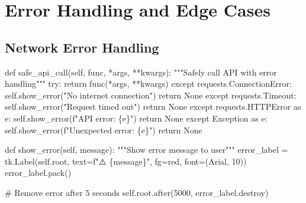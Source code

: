 \documentclass[
  letterpaper,
  DIV=11,
  numbers=noendperiod,
  oneside]{scrreprt}
\newenvironment{Shaded}{}{}
\newcommand{\CommentTok}[1]{\textcolor[rgb]{0.42,0.45,0.49}{#1}}
\newcommand{\ControlFlowTok}[1]{\textcolor[rgb]{0.84,0.23,0.29}{#1}}
\newcommand{\DecValTok}[1]{\textcolor[rgb]{0.00,0.36,0.77}{#1}}
\newcommand{\ImportTok}[1]{\textcolor[rgb]{0.01,0.18,0.38}{#1}}
\newcommand{\KeywordTok}[1]{\textcolor[rgb]{0.84,0.23,0.29}{#1}}
\newcommand{\NormalTok}[1]{\textcolor[rgb]{0.14,0.16,0.18}{#1}}
\newcommand{\OperatorTok}[1]{\textcolor[rgb]{0.14,0.16,0.18}{#1}}
\newcommand{\PreprocessorTok}[1]{\textcolor[rgb]{0.84,0.23,0.29}{#1}}
\newcommand{\SpecialCharTok}[1]{\textcolor[rgb]{0.00,0.36,0.77}{#1}}
\newcommand{\SpecialStringTok}[1]{\textcolor[rgb]{0.01,0.18,0.38}{#1}}
\newcommand{\StringTok}[1]{\textcolor[rgb]{0.01,0.18,0.38}{#1}}
\newcommand{\VariableTok}[1]{\textcolor[rgb]{0.89,0.38,0.04}{#1}}
\begin{document}
\section{Error Handling and Edge
Cases}\label{error-handling-and-edge-cases}

\subsection{Network Error Handling}\label{network-error-handling}

\begin{Shaded}
\begin{Highlighting}[]
\KeywordTok{def}\NormalTok{ safe\_api\_call(}\VariableTok{self}\NormalTok{, func, }\OperatorTok{*}\NormalTok{args, }\OperatorTok{**}\NormalTok{kwargs):}
    \CommentTok{"""Safely call API with error handling"""}
    \ControlFlowTok{try}\NormalTok{:}
        \ControlFlowTok{return}\NormalTok{ func(}\OperatorTok{*}\NormalTok{args, }\OperatorTok{**}\NormalTok{kwargs)}
    \ControlFlowTok{except}\NormalTok{ requests.}\PreprocessorTok{ConnectionError}\NormalTok{:}
        \VariableTok{self}\NormalTok{.show\_error(}\StringTok{"No internet connection"}\NormalTok{)}
        \ControlFlowTok{return} \VariableTok{None}
    \ControlFlowTok{except}\NormalTok{ requests.Timeout:}
        \VariableTok{self}\NormalTok{.show\_error(}\StringTok{"Request timed out"}\NormalTok{)}
        \ControlFlowTok{return} \VariableTok{None}
    \ControlFlowTok{except}\NormalTok{ requests.HTTPError }\ImportTok{as}\NormalTok{ e:}
        \VariableTok{self}\NormalTok{.show\_error(}\SpecialStringTok{f"API error: }\SpecialCharTok{\{}\NormalTok{e}\SpecialCharTok{\}}\SpecialStringTok{"}\NormalTok{)}
        \ControlFlowTok{return} \VariableTok{None}
    \ControlFlowTok{except} \PreprocessorTok{Exception} \ImportTok{as}\NormalTok{ e:}
        \VariableTok{self}\NormalTok{.show\_error(}\SpecialStringTok{f"Unexpected error: }\SpecialCharTok{\{}\NormalTok{e}\SpecialCharTok{\}}\SpecialStringTok{"}\NormalTok{)}
        \ControlFlowTok{return} \VariableTok{None}

\KeywordTok{def}\NormalTok{ show\_error(}\VariableTok{self}\NormalTok{, message):}
    \CommentTok{"""Show error message to user"""}
\NormalTok{    error\_label }\OperatorTok{=}\NormalTok{ tk.Label(}\VariableTok{self}\NormalTok{.root, text}\OperatorTok{=}\SpecialStringTok{f"⚠️ }\SpecialCharTok{\{}\NormalTok{message}\SpecialCharTok{\}}\SpecialStringTok{"}\NormalTok{, }
\NormalTok{                          fg}\OperatorTok{=}\StringTok{\textquotesingle{}red\textquotesingle{}}\NormalTok{, font}\OperatorTok{=}\NormalTok{(}\StringTok{\textquotesingle{}Arial\textquotesingle{}}\NormalTok{, }\DecValTok{10}\NormalTok{))}
\NormalTok{    error\_label.pack()}
    
    \CommentTok{\# Remove error after 5 seconds}
    \VariableTok{self}\NormalTok{.root.after(}\DecValTok{5000}\NormalTok{, error\_label.destroy)}
\end{Highlighting}
\end{Shaded}
\end{document}
